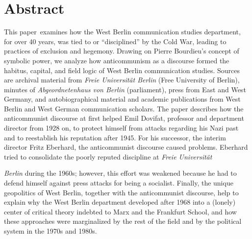 \documentclass{tufte-handout}
\begin{document}
\begin{titlepage}
\begin{fullwidth}
\end{fullwidth}

\vspace*{1em}

\hypertarget{abstract}{%
\section{Abstract}\label{abstract}}

This paper examines how the West Berlin communication studies department, for over 40 years, was tied to or ``disciplined'' by the Cold War, leading to practices of exclusion and hegemony. Drawing on Pierre Bourdieu's concept of symbolic power, we analyze how anticommunism as a discourse formed the habitus, capital, and field logic of West Berlin communication studies. Sources are archival material from \emph{Freie Universität Berlin} (Free University of Berlin), minutes of \emph{Abgeordnetenhaus von Berlin} (parliament), press from East and West Germany, and autobiographical material and academic publications from West Berlin and West German communication scholars. The paper describes how the anticommunist discourse at first helped Emil Dovifat, professor and department director from 1928 on, to protect himself from attacks regarding his Nazi past and to reestablish his reputation after 1945. For his successor, the interim director Fritz Eberhard, the anticommunist discourse caused problems. Eberhard tried to consolidate the poorly reputed discipline at \emph{Freie Universität} 


\enlargethispage{2\baselineskip}

\vspace*{2em}


\end{titlepage}

\noindent \emph{Berlin} during the 1960s; however, this effort was weakened because he had to defend himself against press attacks for being a socialist. Finally, the unique geopolitics of West Berlin, together with the anticommunist discourse, help to explain why the West Berlin department developed after 1968 into a (lonely) center of critical theory indebted to Marx and the Frankfurt School, and how these approaches were marginalized by the rest of the field and by the political system in the 1970s and 1980s.

\vspace*{2em}
\end{document}

